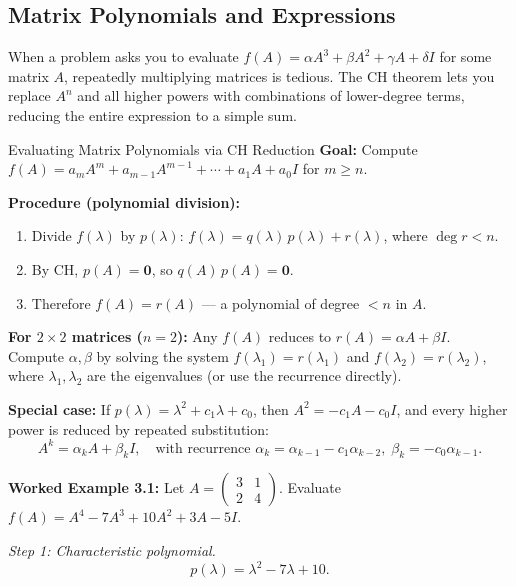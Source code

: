 \documentclass[12pt,a4paper]{article}
\begin{document}
\subsection{Matrix Polynomials and Expressions}

When a problem asks you to evaluate \(f(A) = \alpha A^3 + \beta A^2 + \gamma A + \delta I\) for some matrix \(A\), repeatedly multiplying matrices is tedious. The CH theorem lets you replace \(A^n\) and all higher powers with combinations of lower-degree terms, reducing the entire expression to a simple sum.

\begin{infobox}{Evaluating Matrix Polynomials via CH Reduction}
\textbf{Goal:} Compute \(f(A) = a_m A^m + a_{m-1}A^{m-1} + \cdots + a_1 A + a_0 I\) for \(m \geq n\).

\textbf{Procedure (polynomial division):}
\begin{enumerate}
  \item Divide \(f(\lambda)\) by \(p(\lambda)\):
    \(f(\lambda) = q(\lambda)\,p(\lambda) + r(\lambda)\), where \(\deg r < n\).
  \item By CH, \(p(A) = \mathbf{0}\), so \(q(A)\,p(A) = \mathbf{0}\).
  \item Therefore \(f(A) = r(A)\) --- a polynomial of degree \(< n\) in \(A\).
\end{enumerate}
\textbf{For \(2\times 2\) matrices (\(n=2\)):} Any \(f(A)\) reduces to \(r(A) = \alpha A + \beta I\).\\
Compute \(\alpha, \beta\) by solving the system \(f(\lambda_1) = r(\lambda_1)\) and \(f(\lambda_2) = r(\lambda_2)\), where \(\lambda_1, \lambda_2\) are the eigenvalues (or use the recurrence directly).

\textbf{Special case:} If \(p(\lambda) = \lambda^2 + c_1\lambda + c_0\), then \(A^2 = -c_1 A - c_0 I\), and every higher power is reduced by repeated substitution:
\[
  A^k = \alpha_k A + \beta_k I, \quad \text{with recurrence } \alpha_k = \alpha_{k-1} - c_1\alpha_{k-2},\; \beta_k = -c_0\alpha_{k-1}.
\]
\end{infobox}

\textbf{Worked Example 3.1:} Let \(A = \begin{pmatrix} 3 & 1 \\ 2 & 4 \end{pmatrix}\). Evaluate \(f(A) = A^4 - 7A^3 + 10A^2 + 3A - 5I\).

\textit{Step 1: Characteristic polynomial.}
\[
  p(\lambda) = \lambda^2 - 7\lambda + 10.
\]
\end{document}

